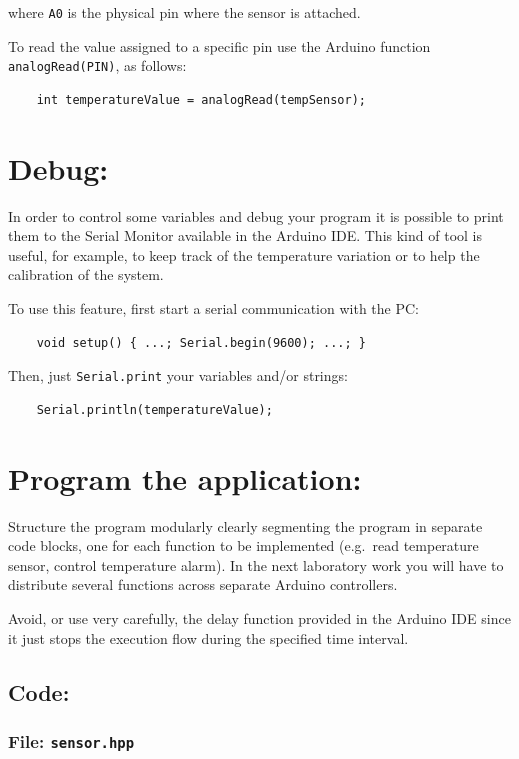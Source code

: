 \documentclass[10pt]{article}
\begin{document}
where \texttt{A0} is the physical pin where the sensor is attached.

To read the value assigned to a specific pin use the Arduino function
\texttt{analogRead(PIN)}, as follows:

\begin{verbatim}
    int temperatureValue = analogRead(tempSensor);
\end{verbatim}

\section{Debug:}
In order to control some variables and debug your program it is possible to print them to the Serial Monitor available in the Arduino IDE. This kind of tool is useful, for example, to keep track of the temperature variation or to help the calibration of the system.

To use this feature, first start a serial communication with the PC:

\begin{verbatim}
    void setup() { ...; Serial.begin(9600); ...; }
\end{verbatim}

Then, just \texttt{Serial.print} your variables and/or strings:
\begin{verbatim}
    Serial.println(temperatureValue);
\end{verbatim}



\section{Program the application:}


Structure the program modularly clearly segmenting the program in separate code
blocks, one for each function to be implemented (e.g.\ read temperature sensor,
control temperature alarm).  In the next laboratory work you will have to
distribute several functions across separate Arduino controllers.

Avoid, or use very carefully, the delay function provided in the Arduino IDE since it just stops the execution flow during the specified time interval.

\subsection{Code:}

\subsubsection{File: \texttt{sensor.hpp}}
\end{document}
